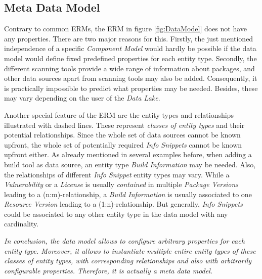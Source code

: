 \subsection{Meta Data Model}
Contrary to common ERMs, the ERM in figure \ref{fig:DataModel} does not have any properties. There are two major reasons for this. Firstly, the just mentioned independence of a specific \emph{Component Model} would hardly be possible if the data model would define fixed predefined properties for each entity type. Secondly, the different scanning tools provide a wide range of information about packages, and other data sources apart from scanning tools may also be added. Consequently, it is practically impossible to predict what properties may be needed. Besides, these may vary depending on the user of the \emph{Data Lake}.\par
Another special feature of the ERM are the entity types and relationships illustrated with dashed lines. These represent \emph{classes of entity types} and their potential relationships. Since the whole set of data sources cannot be known upfront, the whole set of potentially required \emph{Info Snippets} cannot be known upfront either. As already mentioned in several examples before, when adding a build tool as data source, an entity type \emph{Build Information} may be needed. Also, the relationships of different \emph{Info Snippet} entity types may vary. While a \emph{Vulnerability} or a \emph{License} is usually \emph{contained} in multiple \emph{Package Versions} leading to a (n:m)-relationship, a \emph{Build Information} is usually associated to one \emph{Resource Version} leading to a (1:n)-relationship. But generally, \emph{Info Snippets} could be associated to any other entity type in the data model with any cardinality.\par
\emph{In conclusion, the data model allows to configure arbitrary properties for each entity type. Moreover, it allows to instantiate multiple entire entity types of these classes of entity types, with corresponding relationships and also with arbitrarily configurable properties. Therefore, it is actually a meta data model.}\\

